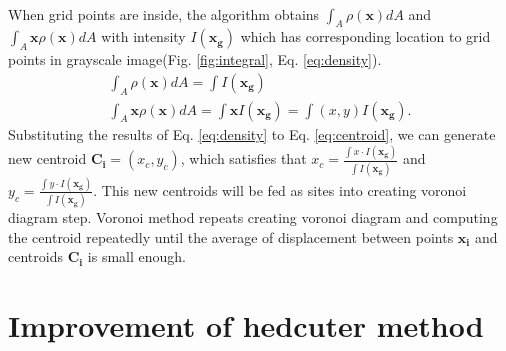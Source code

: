 \documentclass[11pt]{article}
\begin{document}
\\When grid points are inside, the algorithm obtains $\int_{A}\rho(\mathbf{x})dA$ and $\int_{A}\mathbf{x}\rho(\mathbf{x})dA$ with intensity $I(\mathbf{x_g})$ which has corresponding location to grid points in grayscale image(Fig. \ref{fig:integral}, Eq. \ref{eq:density}).
\begin{equation}\label{eq:density} %
\begin{gathered}
\int_{A}\rho(\mathbf{x})dA=\int I(\mathbf{x_g})\\
\int_{A}\mathbf{x}\rho(\mathbf{x})dA=\int \mathbf{x}I(\mathbf{x_g})=\int (x, y)I(\mathbf{x_g}).
\end{gathered}
\end{equation}
Substituting the results of Eq. \ref{eq:density} to Eq. \ref{eq:centroid}, we can generate new centroid $\mathbf{C_i}=(x_c, y_c)$,
which satisfies that $x_c=\frac{\int x\cdot I(\mathbf{x_g})}{\int I(\mathbf{x_g})}$ and $y_c=\frac{\int y\cdot I(\mathbf{x_g})}{\int I(\mathbf{x_g})}$.%
This new centroids will be fed as sites into creating voronoi diagram step. Voronoi method repeats creating voronoi diagram and computing the centroid repeatedly until the average of displacement between points $\mathbf{x_i}$ and centroids $\mathbf{C_i}$ is small enough.
\section{Improvement of hedcuter method}



\end{document}

